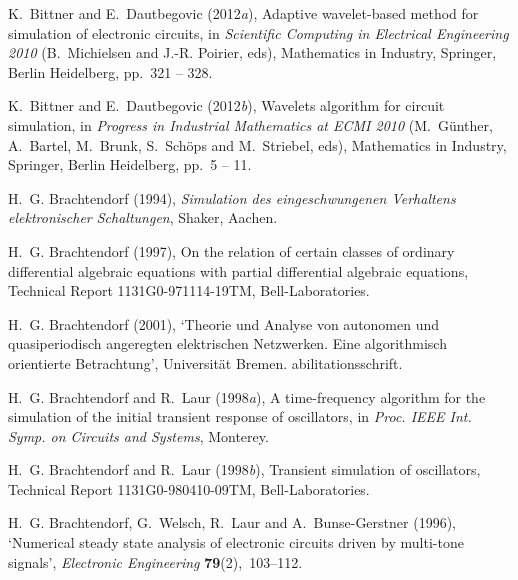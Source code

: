 \documentclass{siamltex}
\begin{document}
\begin{thebibliography}{xx}

K.~Bittner and E.~Dautbegovic  (2012{\em a}), Adaptive wavelet-based method for
  simulation of electronic circuits, in {\em Scientific Computing in Electrical
  Engineering 2010} (B.~Michielsen and J.-R. Poirier, eds), Mathematics in
  Industry, Springer, Berlin Heidelberg, pp.~321 -- 328.

K.~Bittner and E.~Dautbegovic  (2012{\em b}), Wavelets algorithm for circuit
  simulation, in {\em Progress in Industrial Mathematics at ECMI 2010}
  (M.~G\"unther, A.~Bartel, M.~Brunk, S.~Sch\"ops and M.~Striebel, eds),
  Mathematics in Industry, Springer, Berlin Heidelberg, pp.~5 -- 11.

H.~G. Brachtendorf  (1994), {\em {Simulation des eingeschwungenen Verhaltens
  elektronischer Schaltungen}}, Shaker, Aachen.

H.~G. Brachtendorf  (1997), On the relation of certain classes of ordinary
  differential algebraic equations with partial differential algebraic
  equations, Technical Report 1131G0-971114-19TM, Bell-Laboratories.

H.~G. Brachtendorf  (2001), `{Theorie und Analyse von autonomen und
  quasiperiodisch angeregten elektrischen Netzwerken. Eine algorithmisch
  orientierte Betrachtung}', Universit\"at Bremen.
abilitationsschrift.

H.~G. Brachtendorf and R.~Laur  (1998{\em a}), A time-frequency algorithm for
  the simulation of the initial transient response of oscillators, in {\em
  Proc. IEEE Int. Symp. on Circuits and Systems}, Monterey.

H.~G. Brachtendorf and R.~Laur  (1998{\em b}), Transient simulation of
  oscillators, Technical Report 1131G0-980410-09TM, Bell-Laboratories.

H.~G. Brachtendorf, G.~Welsch, R.~Laur and A.~Bunse-Gerstner  (1996),
  `Numerical steady state analysis of electronic circuits driven by multi-tone
  signals', {\em Electronic Engineering} {\bf 79}(2),~103--112.


\end{thebibliography}
\end{document}
